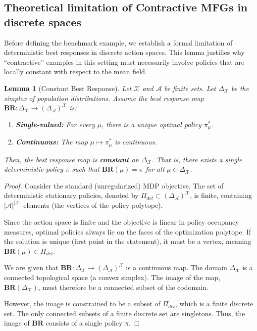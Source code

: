 \documentclass[10pt,twocolumn,letterpaper]{article}
\newtheorem{lemma}[theorem]{Lemma}
\theoremstyle{definition}
\theoremstyle{remark}
\newcommand{\states}{\mathcal{X}}
\newcommand{\actions}{\mathcal{A}}
\newcommand{\BR}{\mathbf{BR}}
\begin{document}
{\color{black}
\subsection{Theoretical limitation of Contractive MFGs in discrete spaces}
\label{sec:contractive-limitation}
Before defining the benchmark example, we establish a formal limitation of deterministic best responses in discrete action spaces. This lemma justifies why ``contractive'' examples in this setting must necessarily involve policies that are locally constant with respect to the mean field.

\begin{lemma}[Constant Best Response]
\label{lem:contraction-constant}
    Let $\states$ and $\actions$ be finite sets. Let $\Delta_\states$ be the simplex of population distributions. Assume the best response map $\BR: \Delta_\states \to (\Delta_\actions)^\states$ is:
    \begin{enumerate}
        \item \textbf{Single-valued:} For every $\mu$, there is a unique optimal policy $\pi^*_\mu$.
        \item \textbf{Continuous:} The map $\mu \mapsto \pi^*_\mu$ is continuous.
    \end{enumerate}
    Then, the best response map is \textbf{constant} on $\Delta_\states$. That is, there exists a single deterministic policy $\pi$ such that $\BR(\mu) = \pi$ for all $\mu \in \Delta_\states$.
\end{lemma}

\begin{proof}
    Consider the standard (unregularized) MDP objective. The set of deterministic stationary policies, denoted by $\Pi_{det} \subset (\Delta_\actions)^\states$, is finite, containing $|\actions|^{|\states|}$ elements (the vertices of the policy polytope).
    
    Since the action space is finite and the objective is linear in policy occupancy measures, optimal policies always lie on the faces of the optimization polytope. If the solution is unique (first point in the statement), it must be a vertex, meaning $\BR(\mu) \in \Pi_{det}$.
    
    We are given that $\BR: \Delta_\states \to (\Delta_\actions)^\states$ is a continuous map. The domain $\Delta_\states$ is a connected topological space (a convex simplex). The image of the map, $\BR(\Delta_\states)$, must therefore be a connected subset of the codomain.
    
    However, the image is constrained to be a subset of $\Pi_{det}$, which is a finite discrete set. The only connected subsets of a finite discrete set are singletons. Thus, the image of $\BR$ consists of a single policy $\pi$.
\end{proof}

}
\end{document}
